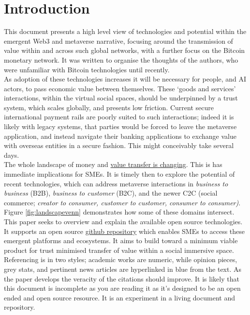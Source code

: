 \documentclass[
	11pt, %
	fleqn, %
	a4paper, %
]{LegrandOrangeBook}
\begin{document}
\section{Introduction}
This document presents a high level view of technologies and potential within the emergent Web3 and metaverse narrative, focusing around the transmission of value within and across such global networks, with a further focus on the Bitcoin monetary network. It was written to organise the thoughts of the authors, who were unfamiliar with Bitcoin technologies until recently.\\
As adoption of these technologies increases it will be necessary for people, and AI actors, to pass economic value between themselves. These `goods and services' interactions, within the virtual social spaces, should be underpinned by a trust system, which scales globally, and presents low friction. Current secure international payment rails are poorly suited to such interactions; indeed it is likely with legacy systems, that parties would be forced to leave the metaverse application, and instead navigate their banking applications to exchange value with overseas entities in a secure fashion. This might conceivably take several days.\\ 
The whole landscape of money and \href{https://www.omfif.org/futureofpayments2021/}{value transfer is changing}. This is has immediate implications for SMEs. It is timely then to explore the potential of recent technologies, which can address metaverse interactions in \textit{business to business} (B2B), \textit{business to customer} (B2C), and the newer C2C (social commerce; \textit{creator to consumer, customer to customer, consumer to consumer\cite{jones2008trust})}. Figure \ref{fig:landscapevenn} demonstrates how some of these domains intersect. This paper seeks to overview and explain the available open source technologies. It supports an open source \href{https://github.com/GMCyberFoundry/Metaverse}{github repository} which enables SMEs to access these emergent platforms and ecosystems. It aims to build toward a minimum viable product for trust minimised transfer of value within a social immersive space.\\
Referencing is in two styles; academic works are numeric, while opinion pieces, grey stats, and pertinent news articles are hyperlinked in blue from the text. As the paper develops the veracity of the citations should improve. It is likely that this document is incomplete as you are reading it as it's designed to be an open ended and open source resource. It is an experiment in a living document and repository.
\end{document}
